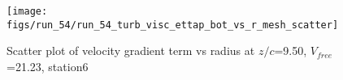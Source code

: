 \begin{figure}[H]
\centering
\texttt{[image: figs/run\_54/run\_54\_turb\_visc\_ettap\_bot\_vs\_r\_mesh\_scatter]}
\caption{Scatter plot of velocity gradient term vs radius at $z/c$=9.50, $V_{free}$=21.23, station6}
\label{fig:run_54_turb_visc_ettap_bot_vs_r_mesh_scatter}
\end{figure}


